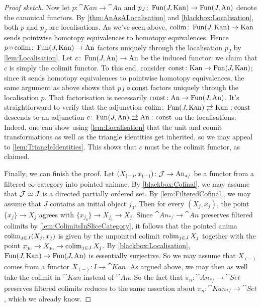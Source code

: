 \begin{proof}[Proof sketch]
	Now let $p\colon\cat{Kan}\rightarrow\cat{An}$ and $p_J\colon \operatorname{Fun}(J,\mathrm{Kan})\rightarrow\operatorname{Fun}(J,\mathrm{An})$ denote the canonical functors. By \cref{thm:AnAsALocalisation} and \cref{blackbox:Localisation}, both $p$ and $p_J$ are localisations. As we've seen above, $\operatorname*{colim}\colon \operatorname{Fun}(J,\mathrm{Kan})\rightarrow\mathrm{Kan}$ sends pointwise homotopy equivalences to homotopy equivalences. Hence $p\circ \operatorname*{colim}\colon \operatorname{Fun}(J,\mathrm{Kan})\rightarrow \mathrm{An}$ factors uniquely through the localisation $p_J$ by \cref{lem:Localisation}. Let $c\colon \operatorname{Fun}(J,\mathrm{An})\rightarrow\mathrm{An}$ be the induced functor; we claim that $c$ is simply the colimit functor. To this end, consider $\operatorname{const}\colon \mathrm{Kan}\rightarrow\operatorname{Fun}(J,\mathrm{Kan})$; since it sends homotopy equivalences to pointwise homotopy equivalences, the same argument as above shows that $p_J\circ \operatorname{const}$ factors uniquely through the localisation $p$. That factorisation is necessarily $\operatorname{const}\colon \mathrm{An}\rightarrow\operatorname{Fun}(J,\mathrm{An})$. It's straightforward to verify that the adjunction $\colimit\colon \Fun(J,\cat{Kan})\shortdoublelrmorphism \cat{Kan}\noloc \const$ descends to an adjunction $c\colon \Fun(J,\cat{An})\shortdoublelrmorphism \cat{An}\noloc \const$ on the localisations. Indeed, one can show using \cref{lem:Localisation} that the unit and counit transformations as well as the triangle identities get inherited, so we may appeal to \cref{lem:TriangleIdentities}. This shows that $c$ must be the colimit functor, as claimed.
	
	Finally, we can finish the proof. Let $(X_{(-)},x_{(-)})\colon\mathcal{J}\rightarrow \mathrm{An}_{*/}$ be a functor from a filtered $\infty$-category into pointed animae. By \cref{blackbox:Cofinal}, we may assume that $\mathcal{J}\simeq J$ is a directed partially ordered set. By \cref{lem:FilteredCofinal}, we may assume that $J$ contains an initial object $j_0$. Then for every $(X_j,x_j)$, the point $\{x_j\}\rightarrow X_j$ agrees with $\{x_{j_0}\}\rightarrow X_{j_0}\rightarrow X_j$. Since $\cat{An}_{*/}\rightarrow\cat{An}$ preserves filtered colimits by \cref{lem:ColimitsInSliceCategory}, it follows that the pointed anima $\operatorname*{colim}_{j\in J}(X_j,x_j)$ is given by the unpointed colimit $\operatorname*{colim}_{j\in J}X_j$ together with the point $x_{j_0}\rightarrow X_{j_0}\rightarrow \operatorname*{colim}_{j\in J}X_j$. By \cref{blackbox:Localisation}, $\operatorname{Fun}(J,\mathrm{Kan})\rightarrow\operatorname{Fun}(J,\mathrm{An})$ is essentially surjective. So we may assume that $X_{(-)}$ comes from a functor $X_{(-)}\colon I\rightarrow\cat{Kan}$. As argued above, we may then as well take the colimit in $\cat{Kan}$ instead of $\cat{An}$. So the fact that $\pi_n\colon \cat{An}_{*/}\rightarrow \cat{Set}$ preserves filtered colimits reduces to the same assertion about $\pi_n\colon\cat{Kan}_{*/}\rightarrow\cat{Set}$, which we already know.
\end{proof}
